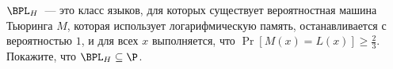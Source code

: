$\BPL_H$~--- это класс языков, для которых существует вероятностная машина Тьюринга $M$, которая использует логарифмическую
память, останавливается с вероятностью $1$, и для всех $x$ выполняется, что $\Pr[M(x) = L(x)] \ge \frac{2}{3}$. Покажите, что
$\BPL_H \subseteq \P$.